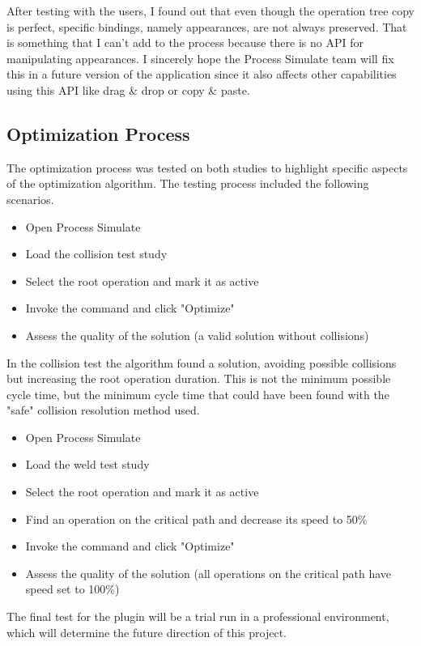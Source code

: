 After testing with the users, I found out that even though the operation tree copy is perfect, specific bindings, namely appearances, are not always preserved.
That is something that I can't add to the process because there is no API for manipulating appearances.
I sincerely hope the Process Simulate team will fix this in a future version of the application since it also affects other capabilities using this API like drag \& drop or copy \& paste. 

\subsection{Optimization Process}

The optimization process was tested on both studies to highlight specific aspects of the optimization algorithm. 
The testing process included the following scenarios.

\begin{itemize}
    \item Open Process Simulate
    \item Load the collision test study
    \item Select the root operation and mark it as active
    \item Invoke the  command and click "Optimize"
    \item Assess the quality of the solution (a valid solution without collisions) 
\end{itemize}

In the collision test the algorithm found a solution, avoiding possible collisions but increasing the root operation duration.
This is not the minimum possible cycle time, but the minimum cycle time that could have been found with the "safe" collision resolution method used.

\begin{itemize}
    \item Open Process Simulate
    \item Load the weld test study
    \item Select the root operation and mark it as active
    \item Find an operation on the critical path and decrease its speed to 50\%
    \item Invoke the  command and click "Optimize"
    \item Assess the quality of the solution (all operations on the critical path have speed set to 100\%) 
\end{itemize}

The final test for the plugin will be a trial run in a professional environment, which will determine the future direction of this project. 